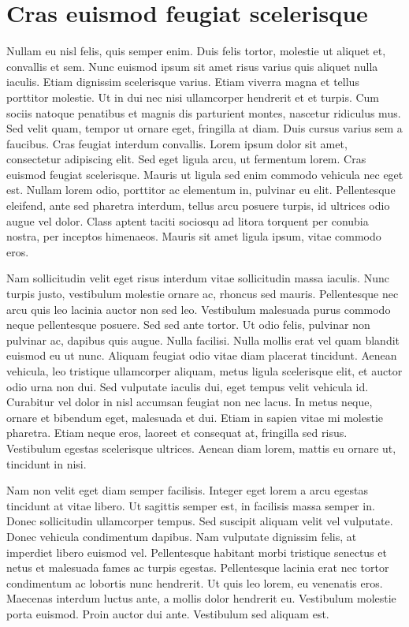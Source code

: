\documentclass{EPUProjetDi}
\begin{document}
\section{Cras euismod feugiat scelerisque}

Nullam eu nisl felis, quis semper enim. Duis felis tortor, molestie ut aliquet et, convallis et sem. Nunc euismod ipsum sit amet risus varius quis aliquet nulla iaculis. Etiam dignissim scelerisque varius. Etiam viverra magna et tellus porttitor molestie. Ut in dui nec nisi ullamcorper hendrerit et et turpis. Cum sociis natoque penatibus et magnis dis parturient montes, nascetur ridiculus mus. Sed velit quam, tempor ut ornare eget, fringilla at diam. Duis cursus varius sem a faucibus. Cras feugiat interdum convallis. Lorem ipsum dolor sit amet, consectetur adipiscing elit. Sed eget ligula arcu, ut fermentum lorem. Cras euismod feugiat scelerisque. Mauris ut ligula sed enim commodo vehicula nec eget est. Nullam lorem odio, porttitor ac elementum in, pulvinar eu elit. Pellentesque eleifend, ante sed pharetra interdum, tellus arcu posuere turpis, id ultrices odio augue vel dolor. Class aptent taciti sociosqu ad litora torquent per conubia nostra, per inceptos himenaeos. Mauris sit amet ligula ipsum, vitae commodo eros.

Nam sollicitudin velit eget risus interdum vitae sollicitudin massa iaculis. Nunc turpis justo, vestibulum molestie ornare ac, rhoncus sed mauris. Pellentesque nec arcu quis leo lacinia auctor non sed leo. Vestibulum malesuada purus commodo neque pellentesque posuere. Sed sed ante tortor. Ut odio felis, pulvinar non pulvinar ac, dapibus quis augue. Nulla facilisi. Nulla mollis erat vel quam blandit euismod eu ut nunc. Aliquam feugiat odio vitae diam placerat tincidunt. Aenean vehicula, leo tristique ullamcorper aliquam, metus ligula scelerisque elit, et auctor odio urna non dui. Sed vulputate iaculis dui, eget tempus velit vehicula id. Curabitur vel dolor in nisl accumsan feugiat non nec lacus. In metus neque, ornare et bibendum eget, malesuada et dui. Etiam in sapien vitae mi molestie pharetra. Etiam neque eros, laoreet et consequat at, fringilla sed risus. Vestibulum egestas scelerisque ultrices. Aenean diam lorem, mattis eu ornare ut, tincidunt in nisi.

Nam non velit eget diam semper facilisis. Integer eget lorem a arcu egestas tincidunt at vitae libero. Ut sagittis semper est, in facilisis massa semper in. Donec sollicitudin ullamcorper tempus. Sed suscipit aliquam velit vel vulputate. Donec vehicula condimentum dapibus. Nam vulputate dignissim felis, at imperdiet libero euismod vel. Pellentesque habitant morbi tristique senectus et netus et malesuada fames ac turpis egestas. Pellentesque lacinia erat nec tortor condimentum ac lobortis nunc hendrerit. Ut quis leo lorem, eu venenatis eros. Maecenas interdum luctus ante, a mollis dolor hendrerit eu. Vestibulum molestie porta euismod. Proin auctor dui ante. Vestibulum sed aliquam est.
\end{document}
